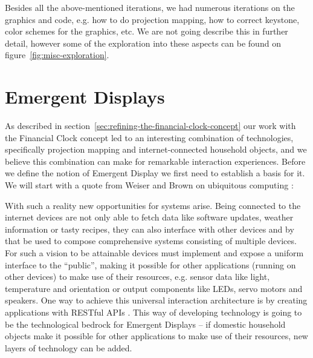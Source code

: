 Besides all the above-mentioned iterations, we had numerous iterations on the graphics and code, e.g. how to do projection mapping, how to correct keystone, color schemes for the graphics, etc. We are not going describe this in further detail, however some of the exploration into these aspects can be found on figure~\ref{fig:misc-exploration}.

\section{Emergent Displays}
As described in section~\ref{sec:refining-the-financial-clock-concept} our work with the Financial Clock concept led to an interesting combination of technologies, specifically projection mapping and internet-connected household objects, and we believe this combination can make for remarkable interaction experiences. Before we define the notion of Emergent Display we first need to establish a basis for it. We will start with a quote from Weiser and Brown on ubiquitous computing \cite[p.~5]{weiser1997coming}:


With such a reality new opportunities for systems arise. Being connected to the internet devices are not only able to fetch data like software updates, weather information or tasty recipes, they can also interface with other devices and by that be used to compose comprehensive systems consisting of multiple devices. For such a vision to be attainable devices must implement and expose a uniform interface to the “public”, making it possible for other applications (running on other devices) to make use of their resources, e.g. sensor data like light, temperature and orientation or output components like LEDs, servo motors and speakers. One way to achieve this universal interaction architecture is by creating applications with RESTful APIs \cite{guinard2011internet}. This way of developing technology is going to be the technological bedrock for Emergent Displays -- if domestic household objects make it possible for other applications to make use of their resources, new layers of technology can be added.

